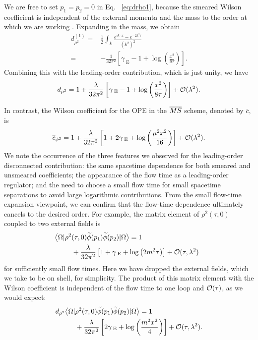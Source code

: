 We are free to set $p_1 = p_2 = 0$ in Eq.~
\eqref{eq:drho1}, because the smeared Wilson coefficient 
is independent of the 
external momenta and the mass to the order at which we are 
working \cite{Collins:1984rdg}. Expanding in the mass, we obtain
\begin{align}
d_{\rho^2}^{(1)} = {} &  
\frac{1}{2}\int_k 
\frac{e^{ik\cdot x} - e^{-2k^2 \tau }}{(k^2)^2} \nonumber \\
 = {} & -\frac{1}{32\pi^2}\left[\gamma_{\;\mathrm{E}} -1 + 
\log\left(\frac{x^2}{8\tau}\right)\right].
\end{align}
Combining this with the leading-order contribution, which is just unity, we have
\begin{equation}\label{eq:drhores}
d_{\rho^2}= 1 +\frac{\lambda}{32\pi^2}\left[\gamma_{\;\mathrm{E}} -1 + 
\log\left(\frac{x^2}{8\tau}\right)\right]+{\cal O}(\lambda^2).
\end{equation}

In contrast, the Wilson coefficient for the OPE in the $\overline{MS}$ scheme, denoted by 
$\overline{c}$, is
\begin{equation}\label{eq:cphires}
\overline{c}_{\phi^2} =  1+\frac{\lambda}{32\pi^2} \left[1 
+2\gamma_{\;\mathrm{E}}+ 
\log\left(\frac{\mu^2x^2}{16}\right)\right]+{\cal O}(\lambda^2).
\end{equation}
We note the occurrence of the three features we observed for the leading-order 
disconnected contribution: the same spacetime dependence for both smeared and 
unsmeared coefficients; the appearance of the flow time as a leading-order 
regulator; and the need to choose a small flow time for small spacetime 
separations to avoid large logarithmic contributions. From the small flow-time 
expansion viewpoint, we can confirm that the flow-time 
dependence ultimately cancels to the desired order. For example, the matrix 
element of $\rho^2(\tau,0)$ coupled to two external fields is
\begin{align}
\!\!\!\!\big\langle \Omega 
|{} & \rho^2(\tau,0)\widetilde{\phi}(p_1) \widetilde{\phi}(p_2)
|\Omega \big\rangle = 1  \nonumber\\
{} &\quad +\frac{\lambda}{32\pi^2}\left[1+\gamma_{\;\mathrm{E}} + 
\log\left(2m^2\tau\right)\right]
+{\cal O}(\tau,\lambda^2)
\end{align}
for sufficiently small flow times. Here we have dropped the external fields, 
which we take to be on shell, for simplicity. The product of this 
matrix element with the Wilson coefficient is independent of the flow time to 
one loop and ${\cal O}(\tau)$, as we would expect:
\begin{align}
d_{\rho^2}\big\langle  \Omega 
|{} &\rho^2(\tau,0)\widetilde{\phi}(p_1)\widetilde{\phi}(p_2)
| \Omega \big\rangle =  1 \nonumber\\
{} & 
+\frac{\lambda}{32\pi^2}\left[2\gamma_{\;\mathrm{E}} + 
\log\left(\frac{m^2x^2}{4}\right)\right]+{\cal O}(\tau,\lambda^2).
\end{align}



